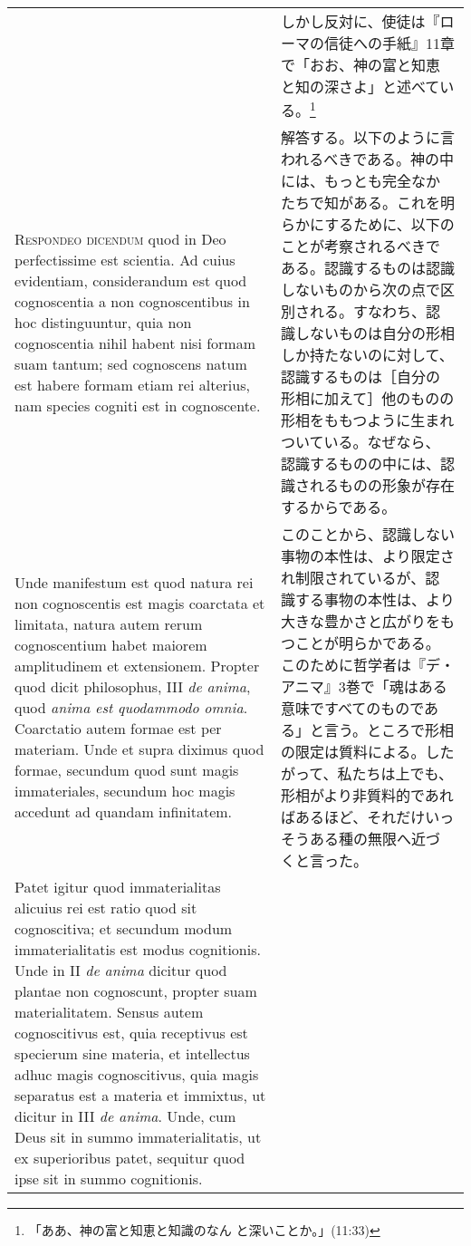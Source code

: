 \documentclass[10pt]{jsarticle} %
\begin{document}
\begin{longtable}{p{21em}p{21em}}
&

しかし反対に、使徒は『ローマの信徒への手紙』11章で「おお、神の富と知恵
と知の深さよ」と述べている。\footnote{「ああ、神の富と知恵と知識のなん
と深いことか。」(11:33)}



\\



{\scshape Respondeo dicendum} quod in Deo perfectissime est
scientia. Ad cuius evidentiam, considerandum est quod cognoscentia a
non cognoscentibus in hoc distinguuntur, quia non cognoscentia nihil
habent nisi formam suam tantum; sed cognoscens natum est habere formam
etiam rei alterius, nam species cogniti est in cognoscente.

&


解答する。以下のように言われるべきである。神の中には、もっとも完全なか
たちで知がある。これを明らかにするために、以下のことが考察されるべきで
ある。認識するものは認識しないものから次の点で区別される。すなわち、認
識しないものは自分の形相しか持たないのに対して、認識するものは［自分の
形相に加えて］他のものの形相をももつように生まれついている。なぜなら、
認識するものの中には、認識されるものの形象が存在するからである。


\\


Unde manifestum est quod natura rei non cognoscentis est magis
coarctata et limitata, natura autem rerum cognoscentium habet maiorem
amplitudinem et extensionem. Propter quod dicit philosophus, III
{\itshape de anima}, quod {\itshape anima est quodammodo
omnia}. Coarctatio autem formae est per materiam. Unde et supra
diximus quod formae, secundum quod sunt magis immateriales, secundum
hoc magis accedunt ad quandam infinitatem.


&

このことから、認識しない事物の本性は、より限定され制限されているが、認
識する事物の本性は、より大きな豊かさと広がりをもつことが明らかである。
このために哲学者は『デ・アニマ』3巻で「魂はある意味ですべてのものであ
る」と言う。ところで形相の限定は質料による。したがって、私たちは上でも、
形相がより非質料的であればあるほど、それだけいっそうある種の無限へ近づ
くと言った。


\\

Patet igitur quod immaterialitas alicuius rei est ratio quod sit
cognoscitiva; et secundum modum immaterialitatis est modus
cognitionis. Unde in II {\itshape de anima} dicitur quod plantae non
cognoscunt, propter suam materialitatem. Sensus autem cognoscitivus
est, quia receptivus est specierum sine materia, et intellectus adhuc
magis cognoscitivus, quia magis separatus est a materia et immixtus,
ut dicitur in III {\itshape de anima}. Unde, cum Deus sit in summo
immaterialitatis, ut ex superioribus patet, sequitur quod ipse sit in
summo cognitionis.


\end{longtable}
\end{document}
